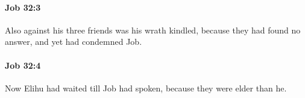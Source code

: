 		\paragraph{Job 32:3} %
			\label{JOB-32-3}

			Also against his three friends was his wrath kindled, because they had found no answer, and yet had condemned Job.


		\paragraph{Job 32:4} %
			\label{JOB-32-4}

			Now Elihu had waited till Job had spoken, because they were elder than he.


